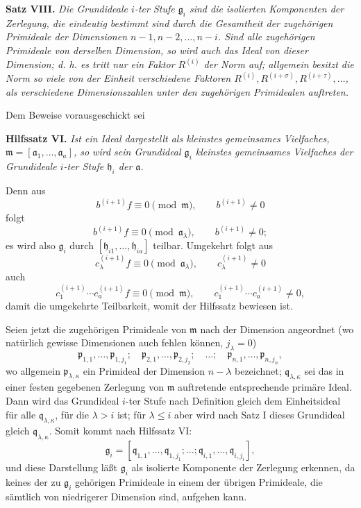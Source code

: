\documentclass[11pt]{article}
\providecommand{\frakm}{\mathfrak m}
\providecommand{\frakp}{\mathfrak p}
\providecommand{\frakq}{\mathfrak q}
\providecommand{\fraka}{\mathfrak a}
\providecommand{\frakg}{\mathfrak g}
\providecommand{\frakh}{\mathfrak h}
\begin{document}
\textbf{Satz VIII.} \emph{Die Grundideale $i$-ter Stufe $\frakg_i$ sind die isolierten Komponenten der Zerlegung, die eindeutig bestimmt sind durch die Gesamtheit der zugehörigen Primideale der Dimensionen $n-1,n-2,\ldots,n-i$. Sind alle zugehörigen Primideale von derselben Dimension, so wird auch das Ideal von dieser Dimension; d. h. es tritt nur ein Faktor $R^{(i)}$ der Norm auf; allgemein besitzt die Norm so viele von der Einheit verschiedene Faktoren $R^{(i)},R^{(i+\sigma)},R^{(i+\tau)},\ldots$, als verschiedene Dimensionszahlen unter den zugehörigen Primidealen auftreten.}

Dem Beweise vorausgeschickt sei

\textbf{Hilfssatz VI.} \emph{Ist ein Ideal dargestellt als kleinstes gemeinsames Vielfaches, $\frakm=[\fraka_1,\ldots,\fraka_a]$, so wird sein Grundideal $\frakg_i$ kleinstes gemeinsames Vielfaches der Grundideale $i$-ter Stufe $\frakh_i$ der $\fraka$.}

Denn aus
\[
 b^{(i+1)}f\equiv0\pmod{\frakm},\qquad b^{(i+1)}\ne0
\]
folgt
\[
 b^{(i+1)}f\equiv0\pmod{\fraka_\lambda},\qquad b^{(i+1)}\ne0;
\]
es wird also $\frakg_i$ durch $[\frakh_{i1},\ldots,\frakh_{ia}]$ teilbar. Umgekehrt folgt aus
\[
 c_\lambda^{(i+1)}f\equiv0\pmod{\fraka_\lambda},\qquad c_\lambda^{(i+1)}\ne0
\]
auch
\[
 c_1^{(i+1)}\cdots c_a^{(i+1)}f\equiv0\pmod{\frakm},\qquad
 c_1^{(i+1)}\cdots c_a^{(i+1)}\ne0,
\]
damit die umgekehrte Teilbarkeit, womit der Hilfssatz bewiesen ist.

Seien jetzt die zugehörigen Primideale von $\frakm$ nach der Dimension angeordnet (wo natürlich gewisse Dimensionen auch fehlen können, $j_\lambda=0$)
\[
 \frakp_{1,1},\ldots,\frakp_{1,j_1};\quad
 \frakp_{2,1},\ldots,\frakp_{2,j_2};\quad\ldots;\quad
 \frakp_{n,1},\ldots,\frakp_{n,j_n},
\]
wo allgemein $\frakp_{\lambda,\kappa}$ ein Primideal der Dimension $n-\lambda$ bezeichnet; $\frakq_{\lambda,\kappa}$ sei das in einer festen gegebenen Zerlegung von $\frakm$ auftretende entsprechende primäre Ideal. Dann wird das Grundideal $i$-ter Stufe nach Definition gleich dem Einheitsideal für alle $\frakq_{\lambda,\kappa}$, für die $\lambda>i$ ist; für $\lambda\le i$ aber wird nach Satz I dieses Grundideal gleich $\frakq_{\lambda,\kappa}$. Somit kommt nach Hilfssatz VI:
\[
 \tag{5}
 \frakg_i=[\frakq_{1,1},\ldots,\frakq_{1,j_1};\ldots;\frakq_{i,1},\ldots,\frakq_{i,j_i}],
\]
und diese Darstellung läßt $\frakg_i$ als isolierte Komponente der Zerlegung erkennen, da keines der zu $\frakg_i$ gehörigen Primideale in einem der übrigen Primideale, die sämtlich von niedrigerer Dimension sind, aufgehen kann.
\end{document}
